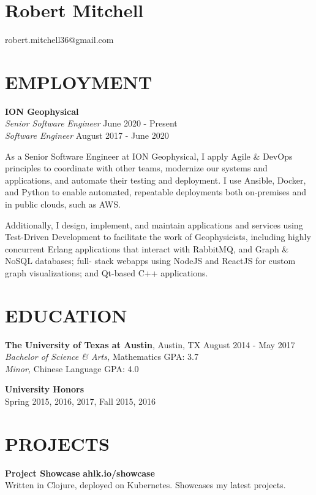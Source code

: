 \documentclass[line,margin]{res}
\begin{document}
\section{Robert Mitchell}
\hfill robert.mitchell36@gmail.com
\address{(832) 392-4834}

\begin{resume}

\section{EMPLOYMENT}
    \textbf{ION Geophysical} \\
    \textit{Senior Software Engineer}
    \hfill June 2020 - Present \\
    \textit{Software Engineer}
    \hfill August 2017 - June 2020

    As a Senior Software Engineer at ION Geophysical, I apply Agile \&
    DevOps principles to coordinate with other teams, modernize our
    systems and applications, and automate their testing and
    deployment. I use Ansible, Docker, and Python to enable automated,
    repeatable deployments both on-premises and in public clouds, such
    as AWS.

    Additionally, I design, implement, and maintain applications and
    services using Test-Driven Development to facilitate the work of
    Geophysicists, including highly concurrent Erlang applications
    that interact with RabbitMQ, and Graph \& NoSQL databases; full-
    stack webapps using NodeJS and ReactJS for custom graph
    visualizations; and Qt-based C++ applications.


\section{EDUCATION}
    \textbf{The University of Texas at Austin}, Austin, TX 	\hfill August 2014 - May 2017 \\
    \textit{Bachelor of Science \& Arts,} Mathematics \hfill GPA: 3.7 \\
    \textit{Minor,} Chinese Language \hfill GPA:    4.0
    \begin{description}
        \item \textbf{University Honors} \hfill \\
            Spring 2015, 2016, 2017, Fall 2015, 2016 \\
    \end{description}


\section{PROJECTS}
    \begin{description}
        \item \textbf{Project Showcase} \hfill \textbf{ahlk.io/showcase} \\
          Written in Clojure, deployed on Kubernetes. Showcases my
          latest projects.


\end{description}
\end{resume}
\end{document}
